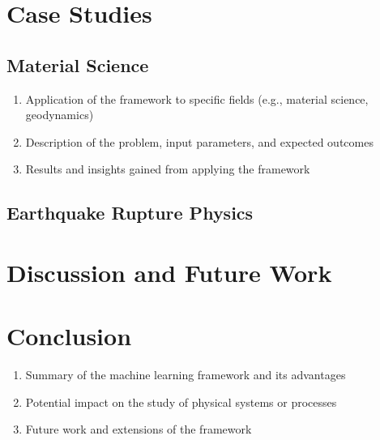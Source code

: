 \documentclass{article}
\begin{document}
\section{Case Studies}

\subsection{Material Science}
\begin{enumerate}
    \item Application of the framework to specific fields (e.g., material science, geodynamics)
    \item Description of the problem, input parameters, and expected outcomes
    \item Results and insights gained from applying the framework
\end{enumerate}

\subsection{Earthquake Rupture Physics}

\section{Discussion and Future Work}

\section{Conclusion}
\begin{enumerate}
    \item Summary of the machine learning framework and its advantages
    \item Potential impact on the study of physical systems or processes
    \item Future work and extensions of the framework
\end{enumerate}
\end{document}
